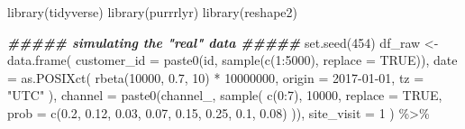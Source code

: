 \documentclass[
]{book}
\newenvironment{Shaded}{\begin{snugshade}}{\end{snugshade}}
\newcommand{\AttributeTok}[1]{\textcolor[rgb]{0.77,0.63,0.00}{#1}}
\newcommand{\ConstantTok}[1]{\textcolor[rgb]{0.00,0.00,0.00}{#1}}
\newcommand{\DecValTok}[1]{\textcolor[rgb]{0.00,0.00,0.81}{#1}}
\newcommand{\DocumentationTok}[1]{\textcolor[rgb]{0.56,0.35,0.01}{\textbf{\textit{#1}}}}
\newcommand{\FloatTok}[1]{\textcolor[rgb]{0.00,0.00,0.81}{#1}}
\newcommand{\FunctionTok}[1]{\textcolor[rgb]{0.00,0.00,0.00}{#1}}
\newcommand{\NormalTok}[1]{#1}
\newcommand{\OtherTok}[1]{\textcolor[rgb]{0.56,0.35,0.01}{#1}}
\newcommand{\SpecialCharTok}[1]{\textcolor[rgb]{0.00,0.00,0.00}{#1}}
\newcommand{\StringTok}[1]{\textcolor[rgb]{0.31,0.60,0.02}{#1}}
\begin{document}
\begin{Shaded}
\begin{Highlighting}[]
\FunctionTok{library}\NormalTok{(tidyverse)}
\FunctionTok{library}\NormalTok{(purrrlyr)}
\FunctionTok{library}\NormalTok{(reshape2)}
 
\DocumentationTok{\#\#\#\#\# simulating the "real" data \#\#\#\#\#}
\FunctionTok{set.seed}\NormalTok{(}\DecValTok{454}\NormalTok{)}
\NormalTok{df\_raw }\OtherTok{\textless{}{-}}
  \FunctionTok{data.frame}\NormalTok{(}
    \AttributeTok{customer\_id =} \FunctionTok{paste0}\NormalTok{(}\StringTok{\textquotesingle{}id\textquotesingle{}}\NormalTok{, }\FunctionTok{sample}\NormalTok{(}\FunctionTok{c}\NormalTok{(}\DecValTok{1}\SpecialCharTok{:}\DecValTok{5000}\NormalTok{), }\AttributeTok{replace =} \ConstantTok{TRUE}\NormalTok{)),}
    \AttributeTok{date =} \FunctionTok{as.POSIXct}\NormalTok{(}
      \FunctionTok{rbeta}\NormalTok{(}\DecValTok{10000}\NormalTok{, }\FloatTok{0.7}\NormalTok{, }\DecValTok{10}\NormalTok{) }\SpecialCharTok{*} \DecValTok{10000000}\NormalTok{,}
      \AttributeTok{origin =} \StringTok{\textquotesingle{}2017{-}01{-}01\textquotesingle{}}\NormalTok{,}
      \AttributeTok{tz =} \StringTok{"UTC"}
\NormalTok{    ),}
    \AttributeTok{channel =} \FunctionTok{paste0}\NormalTok{(}\StringTok{\textquotesingle{}channel\_\textquotesingle{}}\NormalTok{, }\FunctionTok{sample}\NormalTok{(}
      \FunctionTok{c}\NormalTok{(}\DecValTok{0}\SpecialCharTok{:}\DecValTok{7}\NormalTok{),}
      \DecValTok{10000}\NormalTok{,}
      \AttributeTok{replace =} \ConstantTok{TRUE}\NormalTok{,}
      \AttributeTok{prob =} \FunctionTok{c}\NormalTok{(}\FloatTok{0.2}\NormalTok{, }\FloatTok{0.12}\NormalTok{, }\FloatTok{0.03}\NormalTok{, }\FloatTok{0.07}\NormalTok{, }\FloatTok{0.15}\NormalTok{, }\FloatTok{0.25}\NormalTok{, }\FloatTok{0.1}\NormalTok{, }\FloatTok{0.08}\NormalTok{)}
\NormalTok{    )),}
    \AttributeTok{site\_visit =} \DecValTok{1}
\NormalTok{  ) }\SpecialCharTok{\%\textgreater{}\%}
  

\end{Highlighting}
\end{Shaded}
\end{document}
